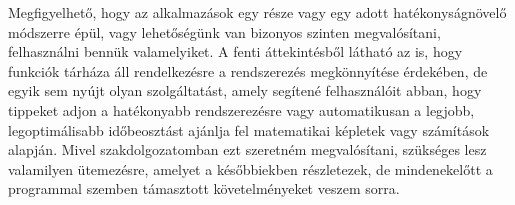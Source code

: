 Megfigyelhető, hogy az alkalmazások egy része vagy egy adott hatékonyságnövelő módszerre épül, vagy lehetőségünk van bizonyos szinten megvalósítani, felhasználni bennük valamelyiket. A fenti áttekintésből látható az is, hogy funkciók tárháza áll rendelkezésre a rendszerezés megkönnyítése érdekében, de egyik sem nyújt olyan szolgáltatást, amely segítené felhasználóit abban, hogy tippeket adjon a hatékonyabb rendszerezésre vagy automatikusan a legjobb, legoptimálisabb időbeosztást ajánlja fel matematikai képletek vagy számítások alapján. Mivel szakdolgozatomban ezt szeretném megvalósítani, szükséges lesz valamilyen ütemezésre, amelyet a későbbiekben részletezek, de mindenekelőtt a programmal szemben támasztott követelményeket veszem sorra.
